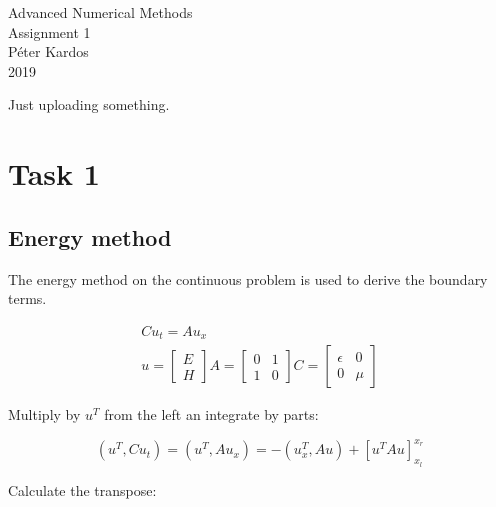 \documentclass[12pt]{article}
\begin{document}
\begin{center}
	\Huge Advanced Numerical Methods\\
	\Large Assignment 1\\
	\vspace{1pc}
	\huge Péter Kardos \\
	\large 2019
\end{center}

Just uploading something.

\section{Task 1}

\subsection{Energy method}

The energy method on the continuous problem is used to derive the boundary terms.

\begin{equation}
    \begin{split}
        Cu_t = Au_x\\    
        u = 
        \begin{bmatrix}
            E\\
            H    
        \end{bmatrix}
        A = 
        \begin{bmatrix}
            0 & 1\\
            1 & 0
        \end{bmatrix}
        C = 
        \begin{bmatrix}
            \epsilon & 0\\
            0 & \mu    
        \end{bmatrix}
    \end{split}
\end{equation}

\noindent Multiply by $u^T$ from the left an integrate by parts:

\begin{equation}\label{eq_cont_energy_ibp}
    (u^T, Cu_t) = (u^T, Au_x) = -(u^T_x, Au) + [u^TAu]_{x_l}^{x_r}
\end{equation}

\noindent Calculate the transpose:
\end{document}
